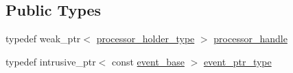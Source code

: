 \subsection*{Public Types}
\begin{DoxyCompactItemize}
\item 
typedef weak\+\_\+ptr$<$ \mbox{\hyperlink{classboost_1_1statechart_1_1processor__container_a3e774bbec52b2b0b9f0dfcde42f33b49}{processor\+\_\+holder\+\_\+type}} $>$ \mbox{\hyperlink{classboost_1_1statechart_1_1processor__container_a82ebbffaed81d7b99119ae0e892f6411}{processor\+\_\+handle}}
\item 
typedef intrusive\+\_\+ptr$<$ const \mbox{\hyperlink{classboost_1_1statechart_1_1event__base}{event\+\_\+base}} $>$ \mbox{\hyperlink{classboost_1_1statechart_1_1processor__container_a0123b4f1061816fce5aa2c2ec4c06934}{event\+\_\+ptr\+\_\+type}}
\end{DoxyCompactItemize}
